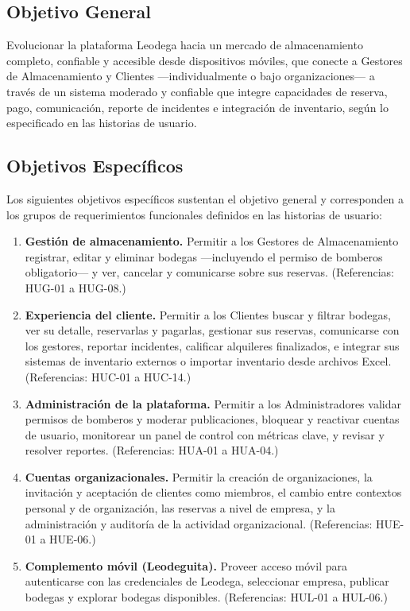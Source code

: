 \subsection{Objetivo General}

Evolucionar la plataforma Leodega hacia un mercado de almacenamiento completo, confiable y accesible desde dispositivos móviles, que conecte a Gestores de Almacenamiento y Clientes ---individualmente o bajo organizaciones--- a través de un sistema moderado y confiable que integre capacidades de reserva, pago, comunicación, reporte de incidentes e integración de inventario, según lo especificado en las historias de usuario.

\subsection{Objetivos Específicos}

Los siguientes objetivos específicos sustentan el objetivo general y corresponden a los grupos de requerimientos funcionales definidos en las historias de usuario:

\begin{enumerate}
    \item \textbf{Gestión de almacenamiento.} Permitir a los Gestores de Almacenamiento registrar, editar y eliminar bodegas ---incluyendo el permiso de bomberos obligatorio--- y ver, cancelar y comunicarse sobre sus reservas. (Referencias: HUG-01 a HUG-08.)
    \item \textbf{Experiencia del cliente.} Permitir a los Clientes buscar y filtrar bodegas, ver su detalle, reservarlas y pagarlas, gestionar sus reservas, comunicarse con los gestores, reportar incidentes, calificar alquileres finalizados, e integrar sus sistemas de inventario externos o importar inventario desde archivos Excel. (Referencias: HUC-01 a HUC-14.)
    \item \textbf{Administración de la plataforma.} Permitir a los Administradores validar permisos de bomberos y moderar publicaciones, bloquear y reactivar cuentas de usuario, monitorear un panel de control con métricas clave, y revisar y resolver reportes. (Referencias: HUA-01 a HUA-04.)
    \item \textbf{Cuentas organizacionales.} Permitir la creación de organizaciones, la invitación y aceptación de clientes como miembros, el cambio entre contextos personal y de organización, las reservas a nivel de empresa, y la administración y auditoría de la actividad organizacional. (Referencias: HUE-01 a HUE-06.)
    \item \textbf{Complemento móvil (Leodeguita).} Proveer acceso móvil para autenticarse con las credenciales de Leodega, seleccionar empresa, publicar bodegas y explorar bodegas disponibles. (Referencias: HUL-01 a HUL-06.)
\end{enumerate}

